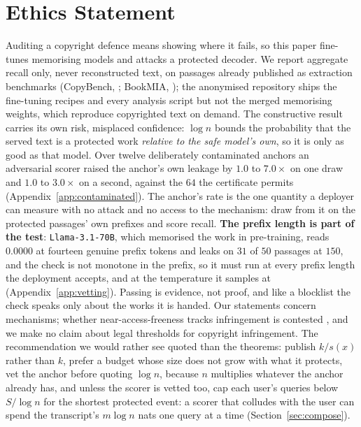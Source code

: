 \documentclass{article}
\begin{document}
\section*{Ethics Statement}
Auditing a copyright defence means showing where it fails, so this paper fine-tunes memorising models
and attacks a protected decoder. We report aggregate recall only, never reconstructed text, on passages
already published as extraction benchmarks (CopyBench, \citealp{chen2024copybench}; BookMIA,
\citealp{shi2024detecting}); the anonymised repository ships the
fine-tuning recipes and every analysis script but not the merged memorising weights, which reproduce
copyrighted text on demand. The constructive result carries its own risk, misplaced confidence: $\log n$
bounds the probability that the served text is a protected work \emph{relative to the safe model's own},
so it is only as good as that model. Over twelve deliberately contaminated anchors an adversarial scorer
raised the anchor's own leakage by $1.0$ to $7.0\times$ on one draw and $1.0$ to $3.0\times$ on a second,
against the $64$ the certificate permits (Appendix~\ref{app:contaminated}). The anchor's rate is the one
quantity a deployer can measure with no attack and no access to the mechanism: draw from it on the
protected passages' own prefixes and score recall. \textbf{The prefix length is part of the test}:
\texttt{Llama-3.1-70B}, which memorised the work in pre-training, reads $0.0000$ at fourteen genuine
prefix tokens and leaks on $31$ of $50$ passages at $150$, and the check is not monotone in the prefix,
so it must run at every prefix length the deployment accepts, and at the temperature it samples at (Appendix~\ref{app:vetting}). Passing is
evidence, not proof, and like a blocklist the check speaks only about the works it is handed. Our
statements concern mechanisms; whether near-access-freeness tracks infringement is contested
\citep{elkinkoren2024copyright}, and we make no claim about legal thresholds for copyright infringement. The
recommendation we would rather see quoted than the theorems: publish $k/s(x)$ rather than $k$, prefer a
budget whose size does not grow with what it protects, vet the anchor before quoting $\log n$,
because $n$ multiplies whatever the anchor already has, and unless the scorer is vetted too, cap each
user's queries below $S/\log n$ for the shortest protected event: a scorer that colludes with the user
can spend the transcript's $m \log n$ nats one query at a time (Section~\ref{sec:compose}).
\end{document}
